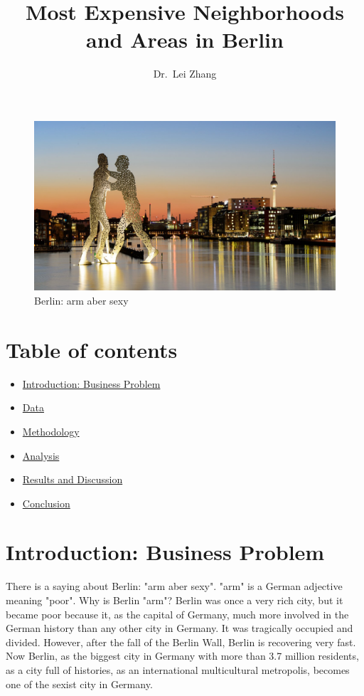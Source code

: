 \documentclass[11pt]{article}
\title{Most Expensive Neighborhoods and Areas in Berlin}
\author{Dr.~Lei Zhang}
\providecommand{\tightlist}{%
      \setlength{\itemsep}{0pt}\setlength{\parskip}{0pt}}
\begin{document}
    
    \maketitle
    



\begin{figure}
\centering
\includegraphics[scale=1.3]{../berlin.jpg}
\caption{Berlin: arm aber sexy}
\end{figure}

    \hypertarget{table-of-contents}{%
\section{Table of contents}\label{table-of-contents}}

\begin{itemize}
\tightlist
\item
  \hyperref[introduction]{Introduction: Business Problem}
\item
  \hyperref[data]{Data}
\item
  \hyperref[methodology]{Methodology}
\item
  \hyperref[analysis]{Analysis}
\item
  \hyperref[results]{Results and Discussion}
\item
  \hyperref[conclusion]{Conclusion}
\end{itemize}

    \hypertarget{introduction-business-problem}{%
\section{\texorpdfstring{Introduction: Business Problem
}{Introduction: Business Problem }}\label{introduction}}


There is a saying about Berlin: "arm aber sexy". "arm" is a German adjective
meaning "poor". Why is Berlin "arm"? Berlin was once a very rich city, but
it became poor because it, as the capital of Germany, much more involved in
the German history than any other city in Germany. It was tragically
occupied and divided. However, after the fall of the Berlin Wall, Berlin is 
recovering very fast. Now Berlin,  as the biggest city in Germany with more
than 3.7 million residents, as a city full of histories, as an
international multicultural metropolis, becomes one of the sexist city in Germany.
\end{document}

